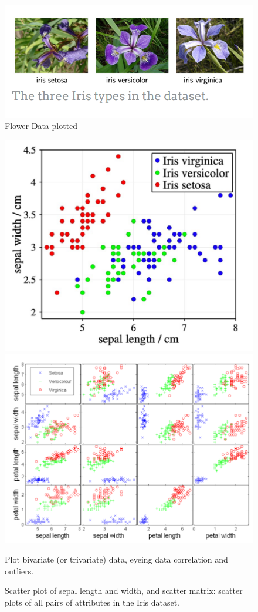 \begin{figure}[htbp]
   \centering
   \includegraphics{images/01/flowers.png}
   \caption{Flower Data plotted}
   \label{fig:01/flower}
\end{figure}

\begin{figure}[htbp]
   \centering
   \includegraphics[width=0.49\columnwidth]{images/01/scatterplot.png}
   \includegraphics[width=0.49\columnwidth]{images/01/scattermatrix.png}
   \caption{Scatter plot of sepal length and width, and scatter matrix: scatter plots of all pairs of attributes in the Iris dataset.}

   Plot bivariate (or trivariate) data, eyeing data correlation and outliers.
   \label{fig:01/scatterplot}
\end{figure}



